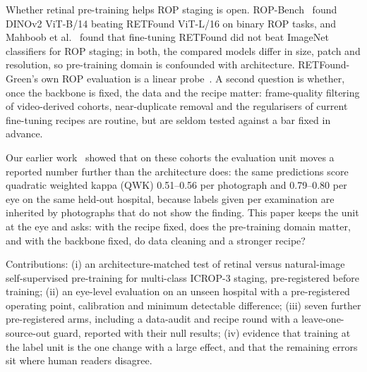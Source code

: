 \documentclass[conference]{IEEEtran}
\begin{document}
Whether retinal pre-training helps ROP staging is open. ROP-Bench~\cite{luo2026} found DINOv2 ViT-B/14 beating RETFound ViT-L/16 on binary ROP tasks, and Mahboob et al.~\cite{mahboob2025} found that fine-tuning RETFound did not beat ImageNet classifiers for ROP staging; in both, the compared models differ in size, patch and resolution, so pre-training domain is confounded with architecture. RETFound-Green's own ROP evaluation is a linear probe~\cite{engelmann2025}. A second question is whether, once the backbone is fixed, the data and the recipe matter: frame-quality filtering of video-derived cohorts, near-duplicate removal and the regularisers of current fine-tuning recipes are routine, but are seldom tested against a bar fixed in advance.

Our earlier work~\cite{nagpure2026} showed that on these cohorts the evaluation unit moves a reported number further than the architecture does: the same predictions score quadratic weighted kappa (QWK) 0.51--0.56 per photograph and 0.79--0.80 per eye on the same held-out hospital, because labels given per examination are inherited by photographs that do not show the finding. This paper keeps the unit at the eye and asks: with the recipe fixed, does the pre-training domain matter, and with the backbone fixed, do data cleaning and a stronger recipe?

Contributions: (i) an architecture-matched test of retinal versus natural-image self-supervised pre-training for multi-class ICROP-3 staging, pre-registered before training; (ii) an eye-level evaluation on an unseen hospital with a pre-registered operating point, calibration and minimum detectable difference; (iii) seven further pre-registered arms, including a data-audit and recipe round with a leave-one-source-out guard, reported with their null results; (iv) evidence that training at the label unit is the one change with a large effect, and that the remaining errors sit where human readers disagree.
\end{document}
